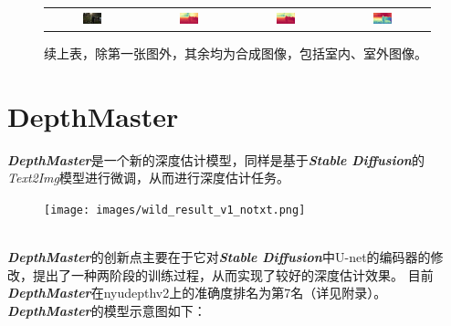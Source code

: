 \documentclass{article}
\begin{document}
\begin{figure}[H]
\begin{tabular}{cccc}
    \includegraphics[width=0.22\textwidth]{images/test-image/synthetic-outside-03.jpg} &
    \includegraphics[width=0.22\textwidth]{images/trained/synthetic-outside-03_pred_colored.png} &
    \includegraphics[width=0.22\textwidth]{images/pretrained/synthetic-outside-03_pred_colored.png} &
    \includegraphics[width=0.22\textwidth]{images/depthmaster/synthetic-outside-03_pred_colored.jpg} \\
  \end{tabular}
  \caption{续上表，除第一张图外，其余均为合成图像，包括室内、室外图像。}
\end{figure}

\newpage

\section{DepthMaster}

\textit{\textbf{DepthMaster}}是一个新的深度估计模型，同样是基于\textit{\textbf{Stable Diffusion}}的\textit{Text2Img}模型进行微调，从而进行深度估计任务。

\begin{figure}[h!]
  \centering
  \texttt{[image: images/wild\_result\_v1\_notxt.png]}
\end{figure}

\\

\textit{\textbf{DepthMaster}}的创新点主要在于它对\textit{\textbf{Stable Diffusion}}中U-net的编码器的修改，提出了一种两阶段的训练过程，从而实现了较好的深度估计效果。
目前\textit{\textbf{DepthMaster}}在nyudepthv2上的准确度排名为第7名（详见附录）。 \\
\textit{\textbf{DepthMaster}}的模型示意图如下：
\end{document}

